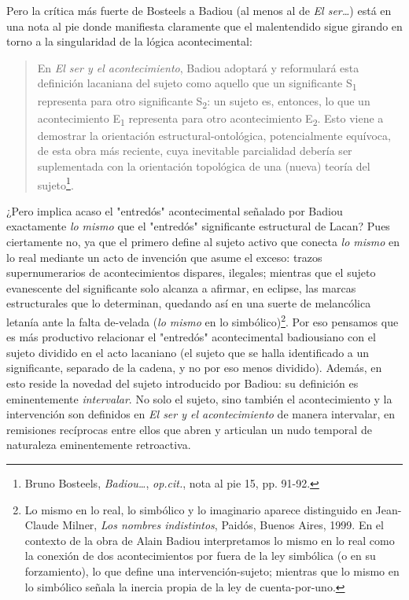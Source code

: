 \documentclass{book}
\begin{document}
Pero la crítica más fuerte de Bosteels a Badiou (al menos al de \emph{El
ser\ldots{}}) está en una nota al pie donde manifiesta claramente que el
malentendido sigue girando en torno a la singularidad de la lógica
acontecimental:

\begin{quote}
En \emph{El ser y el acontecimiento}, Badiou adoptará y reformulará esta
definición lacaniana del sujeto como aquello que un significante
S\textsubscript{1} representa para otro significante S\textsubscript{2}:
un sujeto es, entonces, lo que un acontecimiento E\textsubscript{1}
representa para otro acontecimiento E\textsubscript{2}. Esto viene a
demostrar la orientación estructural-ontológica, potencialmente
equívoca, de esta obra más reciente, cuya inevitable parcialidad debería
ser suplementada con la orientación topológica de una (nueva) teoría del
sujeto\footnote{Bruno Bosteels, \emph{Badiou\ldots{}}, \emph{op.cit.},
  nota al pie 15, pp. 91-92.}.
\end{quote}

¿Pero implica acaso el "entredós" acontecimental señalado por Badiou
exactamente \emph{lo mismo} que el "entredós" significante estructural
de Lacan? Pues ciertamente no, ya que el primero define al sujeto activo
que conecta \emph{lo mismo} en lo real mediante un acto de invención que
asume el exceso: trazos supernumerarios de acontecimientos dispares,
ilegales; mientras que el sujeto evanescente del significante solo
alcanza a afirmar, en eclipse, las marcas estructurales que lo
determinan, quedando así en una suerte de melancólica letanía ante la
falta de-velada (\emph{lo mismo} en lo simbólico)\footnote{Lo mismo en
  lo real, lo simbólico y lo imaginario aparece distinguido en
  Jean-Claude Milner, \emph{Los nombres indistintos}, Paidós, Buenos
  Aires, 1999. En el contexto de la obra de Alain Badiou interpretamos
  lo mismo en lo real como la conexión de dos acontecimientos por fuera
  de la ley simbólica (o en su forzamiento), lo que define una
  intervención-sujeto; mientras que lo mismo en lo simbólico señala la
  inercia propia de la ley de cuenta-por-uno.}. Por eso pensamos que es
más productivo relacionar el "entredós" acontecimental badiousiano con
el sujeto dividido en el acto lacaniano (el sujeto que se halla
identificado a un significante, separado de la cadena, y no por eso
menos dividido). Además, en esto reside la novedad del sujeto
introducido por Badiou: su definición es eminentemente
\emph{intervalar}. No solo el sujeto, sino también el acontecimiento y
la intervención son definidos en \emph{El ser y el acontecimiento} de
manera intervalar, en remisiones recíprocas entre ellos que abren y
articulan un nudo temporal de naturaleza eminentemente retroactiva.
\end{document}

